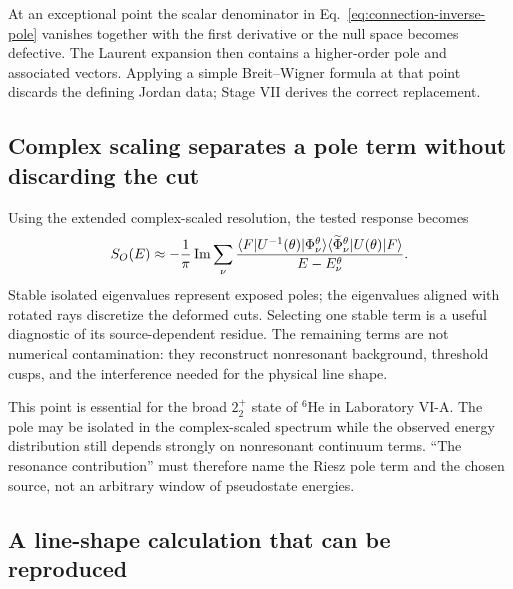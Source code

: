 At an exceptional point the scalar denominator in
Eq.~\eqref{eq:connection-inverse-pole} vanishes together with the first
derivative or the null space becomes defective.  The Laurent expansion then
contains a higher-order pole and associated vectors.  Applying a simple
Breit--Wigner formula at that point discards the defining Jordan data; Stage
VII derives the correct replacement.

\subsection{Complex scaling separates a pole term without discarding the cut}
\label{subsec:resonance-formula-csm}

Using the extended complex-scaled resolution, the tested response becomes
\begin{equation}
  S_O(E)
  \approx-\frac{1}{\pi}\operatorname{Im}
  \sum_\nu
  \frac{
  \langle F \rvert U^{-1}(\theta)\lvert \Phi_\nu^\theta \rangle
  \langle \widetilde\Phi_\nu^\theta \rvert U(\theta)\lvert F \rangle}
  {E-E_\nu^\theta}.
  \label{eq:resonance-formula-csm-response}
\end{equation}
Stable isolated eigenvalues represent exposed poles; the eigenvalues aligned
with rotated rays discretize the deformed cuts.  Selecting one stable term is
a useful diagnostic of its source-dependent residue.  The remaining terms
are not numerical contamination: they reconstruct nonresonant background,
threshold cusps, and the interference needed for the physical line shape.

This point is essential for the broad $2_2^+$ state of $^6$He in Laboratory
VI-A.  The pole may be isolated in the complex-scaled spectrum while the
observed energy distribution still depends strongly on nonresonant continuum
terms.  ``The resonance contribution'' must therefore name the Riesz pole
term and the chosen source, not an arbitrary window of pseudostate energies.

\subsection{A line-shape calculation that can be reproduced}
\label{subsec:line-shape-protocol}


